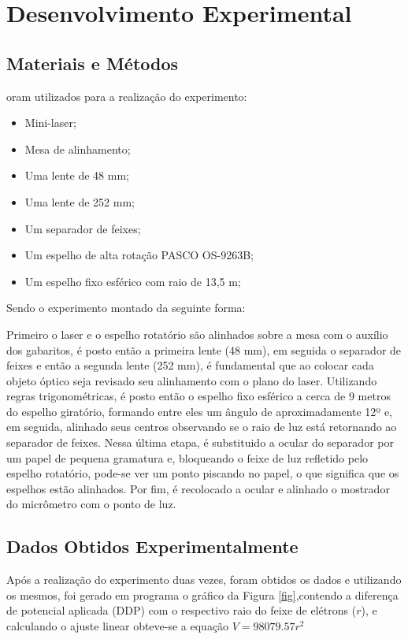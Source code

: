 \section{Desenvolvimento Experimental}
\subsection{Materiais e Métodos}
oram utilizados para a realização do experimento:
\begin{itemize}
	\item Mini-laser;
	\item Mesa de alinhamento;
	\item Uma lente de 48 mm;
	\item Uma lente de 252 mm;
	\item Um separador de feixes;
	\item Um espelho de alta rotação PASCO OS-9263B;
	\item Um espelho fixo esférico com raio de 13,5 m;
\end{itemize}
Sendo o experimento montado da seguinte forma:
		


Primeiro o laser e o espelho rotatório são alinhados sobre a mesa com o auxílio dos gabaritos, é posto então a primeira lente (48 mm), em seguida o separador de feixes e então a segunda lente (252 mm), é fundamental que ao colocar cada objeto óptico seja revisado seu alinhamento com o plano do laser. Utilizando regras trigonométricas, é posto então o espelho fixo esférico a cerca de 9 metros
do espelho giratório, formando entre eles um ângulo de aproximadamente 12º e, em seguida, alinhado seus centros observando  se o raio de luz está retornando ao separador de feixes. Nessa última etapa, é substituido a ocular do separador por um papel de pequena gramatura e, bloqueando o feixe de luz refletido pelo espelho rotatório, pode-se ver um ponto piscando no papel, o que significa que os espelhos estão alinhados. Por fim, é recolocado a ocular e alinhado o mostrador do micrômetro com o ponto de luz.

\subsection{Dados Obtidos Experimentalmente}
Após a realização do experimento duas vezes, foram obtidos os dados e utilizando os mesmos, foi gerado em programa o gráfico da Figura \ref{fig},contendo a diferença de potencial aplicada (DDP) com o respectivo raio do feixe de elétrons ($r$), e calculando o ajuste linear obteve-se a equação $V = 98079.57r^2 $

